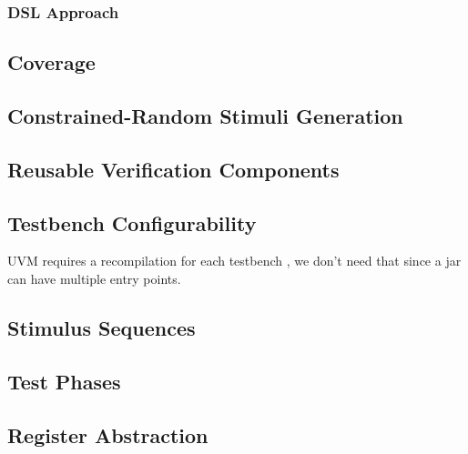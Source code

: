 \documentclass[12pt]{report}
\begin{document}
\subsubsection{DSL Approach}

\subsection{Coverage} %

\subsection{Constrained-Random Stimuli Generation} %

\subsection{Reusable Verification Components} %

\subsection{Testbench Configurability} %

UVM requires a recompilation for each testbench \cite{salemi2013uvm}, we don't need that since a jar can have
multiple entry points.

\subsection{Stimulus Sequences} %

\subsection{Test Phases} %

\subsection{Register Abstraction} %
\end{document}
